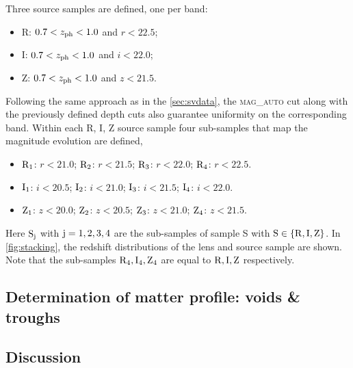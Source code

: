 Three source samples are defined, one per band:
\begin{itemize}
	\item R: $0.7 < z_{\rm ph} < 1.0$ and $r<22.5$;
	\item I: $0.7 < z_{\rm ph} < 1.0$ and $i<22.0$;
	\item Z: $0.7 < z_{\rm ph} < 1.0$ and $z<21.5$.
\end{itemize}

Following the same approach as in the \autoref{sec:svdata}, the {\scshape mag\_auto} cut along with the previously defined depth cuts also guarantee uniformity on the corresponding band. Within each R, I, Z source sample four sub-samples that map the magnitude evolution are defined,
\begin{itemize}
	\item $\rm R_1$: $r<21.0$; $\rm R_2$: $r<21.5$; $\rm R_3$: $r<22.0$; $\rm R_4$: $r<22.5$.
	\item $\rm I_1$: $i<20.5$; $\rm I_2$: $i<21.0$; $\rm I_3$: $i<21.5$; $\rm I_4$: $i<22.0$.
	\item $\rm Z_1$: $z<20.0$; $\rm Z_2$: $z<20.5$; $\rm Z_3$: $z<21.0$; $\rm Z_4$: $z<21.5$.
\end{itemize}
Here $\rm S_j$ with $\rm j=1,2,3,4$ are the sub-samples of sample S with $\rm S\in \{R,I,Z\}$. In \autoref{fig:stacking}, the redshift distributions of the lens and source sample are shown. Note that the sub-samples $\rm R_4, I_4, Z_4$ are equal to $\rm R, I , Z$ respectively.

\subsection{Determination of matter profile: voids \& troughs}
\label{sec:analysis_y1}

\subsection{Discussion}
\label{sec:discussion_y1}
